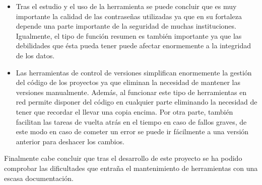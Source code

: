 \begin{itemize}
	\item Tras el estudio y el uso de la herramienta se puede concluir que es muy importante la calidad de las contraseñas utilizadas ya que en su fortaleza depende una parte importante de la seguridad de muchas instituciones. Igualmente, el tipo de función resumen es también importante ya que las debilidades que ésta pueda tener puede afectar enormemente a la integridad de los datos.
		
	\item Las herramientas de control de versiones simplifican enormemente la gestión del código de los proyectos ya que eliminan la necesidad de mantener las versiones manualmente. Además, al funcionar este tipo de herramientas en red permite disponer del código en cualquier parte eliminando la necesidad de tener que recordar el llevar una copia encima. Por otra parte, también facilitan las tareas de vuelta atrás en el tiempo en caso de fallos graves, de este modo en caso de cometer un error se puede ir fácilmente a una versión anterior para deshacer los cambios.
\end{itemize}

Finalmente cabe concluir que tras el desarrollo de este proyecto se ha podido comprobar las dificultades que entraña el mantenimiento de herramientas con una escasa documentación.
